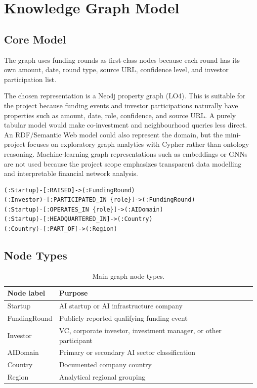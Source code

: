\documentclass[11pt,a4paper]{article}
\begin{document}
\section{Knowledge Graph Model}
\label{sec:model}

\subsection{Core Model}

The graph uses funding rounds as first-class nodes because each round has its
own amount, date, round type, source URL, confidence level, and investor
participation list.

The chosen representation is a Neo4j property graph (LO4). This is suitable for
the project because funding events and investor participations naturally have
properties such as amount, date, role, confidence, and source URL. A purely
tabular model would make co-investment and neighbourhood queries less direct.
An RDF/Semantic Web model could also represent the domain, but the mini-project
focuses on exploratory graph analytics with Cypher rather than ontology
reasoning. Machine-learning graph representations such as embeddings or GNNs
are not used because the project scope emphasizes transparent data modelling
and interpretable financial network analysis.

\begin{lstlisting}[language={}]
(:Startup)-[:RAISED]->(:FundingRound)
(:Investor)-[:PARTICIPATED_IN {role}]->(:FundingRound)
(:Startup)-[:OPERATES_IN {role}]->(:AIDomain)
(:Startup)-[:HEADQUARTERED_IN]->(:Country)
(:Country)-[:PART_OF]->(:Region)
\end{lstlisting}

\subsection{Node Types}

\begin{table}[H]
\centering
\begin{tabular}{ll}
\toprule
Node label & Purpose \\
\midrule
Startup & AI startup or AI infrastructure company \\
FundingRound & Publicly reported qualifying funding event \\
Investor & VC, corporate investor, investment manager, or other participant \\
AIDomain & Primary or secondary AI sector classification \\
Country & Documented company country \\
Region & Analytical regional grouping \\
\bottomrule
\end{tabular}
\caption{Main graph node types.}
\end{table}
\end{document}
